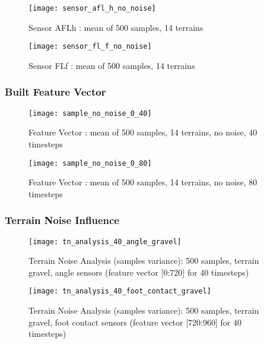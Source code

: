 \begin{figure}[H]
  \centering
  \texttt{[image: sensor\_afl\_h\_no\_noise]}
  \caption{Sensor AFLh : mean of 500 samples, 14 terrains}
  \label{fig:sensor_afl_h_no_noise}
\end{figure}

\begin{figure}[H]
  \centering
  \texttt{[image: sensor\_fl\_f\_no\_noise]}
  \caption{Sensor FLf : mean of 500 samples, 14 terrains}
  \label{fig:sensor_fl_f_no_noise}
\end{figure}

\subsubsection*{Built Feature Vector} \label{sssec:built_feature_vectors}

\begin{figure}[H]
  \centering
  \texttt{[image: sample\_no\_noise\_0\_40]}
  \caption{Feature Vector : mean of 500 samples, 14 terrains, no noise, 40 timesteps}
  \label{fig:sample_40t}
\end{figure}


\begin{figure}[H]
  \centering
  \texttt{[image: sample\_no\_noise\_0\_80]}
  \caption{Feature Vector : mean of 500 samples, 14 terrains, no noise, 80 timesteps}
  \label{fig:sample_80t}
\end{figure}

\subsubsection*{Terrain Noise Influence} \label{sssec:terrain_noise_influence}

\begin{figure}[H]
  \centering
  \texttt{[image: tn\_analysis\_40\_angle\_gravel]}
  \caption{Terrain Noise Analysis (samples variance): 500 samples, terrain gravel, angle sensors (feature vector [0:720] for 40 timesteps)}
  \label{fig:tn_analysis_angle_gravel}
\end{figure}

\begin{figure}[H]
  \centering
  \texttt{[image: tn\_analysis\_40\_foot\_contact\_gravel]}
  \caption{Terrain Noise Analysis (samples variance): 500 samples, terrain gravel, foot contact sensors (feature vector [720:960] for 40 timesteps)}
  \label{fig:tn_analysis_foot_contact_gravel}
\end{figure}

